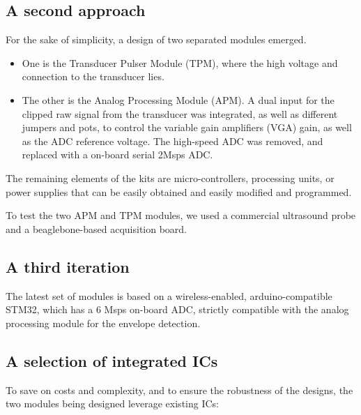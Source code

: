 \documentclass[letterpaper, 10 pt, conference]{ieeeconf} %
\begin{document}
\subsection{A second approach}

For the sake of simplicity, a design of two separated modules emerged.

\begin{itemize} 
\item One is the Transducer Pulser Module (TPM), where the high voltage and connection to the transducer lies.
\item The other is the Analog Processing Module (APM). A dual input for the clipped raw signal from the transducer was integrated, as well as different jumpers and pots, to control the variable gain amplifiers (VGA) gain, as well as the ADC reference voltage. The high-speed ADC was removed, and replaced with a on-board serial 2Msps ADC.
\end{itemize}

The remaining elements of the kits are micro-controllers, processing units, or power supplies that can be easily obtained and easily modified and programmed.

To test the two APM and TPM modules, we used a commercial ultrasound probe and a beaglebone-based acquisition board.

\subsection{A third iteration}

The latest set of modules is based on a wireless-enabled, arduino-compatible STM32, which has a 6 Msps on-board ADC, strictly compatible with the analog processing module for the envelope detection.

\subsection{A selection of integrated ICs}

To save on costs and complexity, and to ensure the robustness of the designs, the two modules being designed leverage existing ICs:
\end{document}
